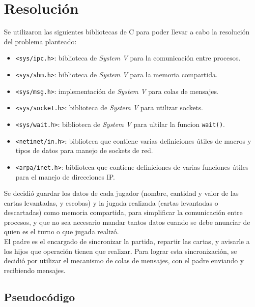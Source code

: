 \section{Resolución}

Se utilizaron las siguientes bibliotecas de C para poder llevar a cabo la resolución del problema planteado:\\

\begin{itemize}
    \item \texttt{<sys/ipc.h>}: biblioteca de \textit{System V} para la comunicación entre procesos.
    \item \texttt{<sys/shm.h>}: biblioteca de \textit{System V} para la memoria compartida.
    \item \texttt{<sys/msg.h>}: implementación de \textit{System V} para colas de mensajes.
    \item \texttt{<sys/socket.h>}: biblioteca de \textit{System V} para utilizar sockets.
    \item \texttt{<sys/wait.h>}: biblioteca de \textit{System V} para ultilar la funcion \texttt{wait()}.
    \item \texttt{<netinet/in.h>}: biblioteca que contiene varias definiciones útiles de macros y tipos de datos para manejo de sockets de red.
    \item \texttt{<arpa/inet.h>}: biblioteca que contiene definiciones de varias funciones útiles para el manejo de direcciones IP.\\
    
\end{itemize}

Se decidió guardar los datos de cada jugador (nombre, cantidad y valor de las cartas levantadas, y escobas) y la jugada realizada (cartas levantadas o descartadas) como memoria compartida, para simplificar la comunicación entre procesos, y que no sea necesario mandar tantos datos cuando se debe anunciar de quien es el turno o que jugada realizó.\\

El padre es el encargado de sincronizar la partida, repartir las cartas, y avisarle a los hijos que operación tienen que realizar. Para lograr esta sincronización, se decidió por utilizar el mecanismo de colas de mensajes, con el padre enviando y recibiendo mensajes.\\


\subsection{Pseudocódigo}

